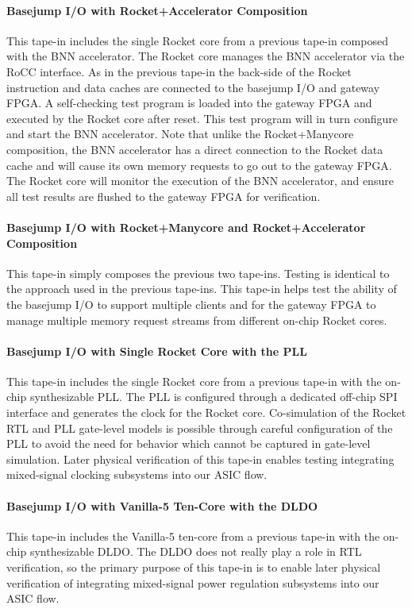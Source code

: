 \paragraph{Basejump I/O with Rocket+Accelerator Composition}
This tape-in includes the single Rocket core from a previous tape-in
composed with the BNN accelerator. The Rocket core manages the BNN
accelerator via the RoCC interface. As in the previous tape-in the
back-side of the Rocket instruction and data caches are connected to the
basejump I/O and gateway FPGA. A self-checking test program is loaded
into the gateway FPGA and executed by the Rocket core after reset. This
test program will in turn configure and start the BNN accelerator. Note
that unlike the Rocket+Manycore composition, the BNN accelerator has a
direct connection to the Rocket data cache and will cause its own memory
requests to go out to the gateway FPGA. The Rocket core will monitor the
execution of the BNN accelerator, and ensure all test results are flushed
to the gateway FPGA for verification.

\paragraph{Basejump I/O with Rocket+Manycore and Rocket+Accelerator
 Composition}
This tape-in simply composes the previous two tape-ins. Testing is
identical to the approach used in the previous tape-ins. This tape-in
helps test the ability of the basejump I/O to support multiple clients
and for the gateway FPGA to manage multiple memory request streams from
different on-chip Rocket cores.

\paragraph{Basejump I/O with Single Rocket Core with the PLL}
This tape-in includes the single Rocket core from a previous tape-in with
the on-chip synthesizable PLL. The PLL is configured through a dedicated
off-chip SPI interface and generates the clock for the Rocket core.
Co-simulation of the Rocket RTL and PLL gate-level models is possible
through careful configuration of the PLL to avoid the need for behavior
which cannot be captured in gate-level simulation. Later physical
verification of this tape-in enables testing integrating mixed-signal
clocking subsystems into our ASIC flow.

\paragraph{Basejump I/O with Vanilla-5 Ten-Core with the DLDO}
This tape-in includes the Vanilla-5 ten-core from a previous tape-in with
the on-chip synthesizable DLDO. The DLDO does not really play a role in
RTL verification, so the primary purpose of this tape-in is to enable
later physical verification of integrating mixed-signal power regulation
subsystems into our ASIC flow.

